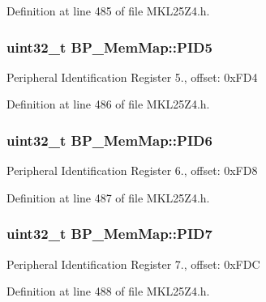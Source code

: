 Definition at line 485 of file M\+K\+L25\+Z4.\+h.

\subsubsection[{\texorpdfstring{P\+I\+D5}{PID5}}]{\setlength{\rightskip}{0pt plus 5cm}uint32\+\_\+t B\+P\+\_\+\+Mem\+Map\+::\+P\+I\+D5}\hypertarget{struct_b_p___mem_map_abb77e60e581e55fe33af44ebf1030116}{}\label{struct_b_p___mem_map_abb77e60e581e55fe33af44ebf1030116}
Peripheral Identification Register 5., offset\+: 0x\+F\+D4 

Definition at line 486 of file M\+K\+L25\+Z4.\+h.

\subsubsection[{\texorpdfstring{P\+I\+D6}{PID6}}]{\setlength{\rightskip}{0pt plus 5cm}uint32\+\_\+t B\+P\+\_\+\+Mem\+Map\+::\+P\+I\+D6}\hypertarget{struct_b_p___mem_map_a9f611c760b2dc672f72485a6751ae703}{}\label{struct_b_p___mem_map_a9f611c760b2dc672f72485a6751ae703}
Peripheral Identification Register 6., offset\+: 0x\+F\+D8 

Definition at line 487 of file M\+K\+L25\+Z4.\+h.

\subsubsection[{\texorpdfstring{P\+I\+D7}{PID7}}]{\setlength{\rightskip}{0pt plus 5cm}uint32\+\_\+t B\+P\+\_\+\+Mem\+Map\+::\+P\+I\+D7}\hypertarget{struct_b_p___mem_map_a60dff3ca8ab0f81ef166fffd7fbc3356}{}\label{struct_b_p___mem_map_a60dff3ca8ab0f81ef166fffd7fbc3356}
Peripheral Identification Register 7., offset\+: 0x\+F\+DC 

Definition at line 488 of file M\+K\+L25\+Z4.\+h.

